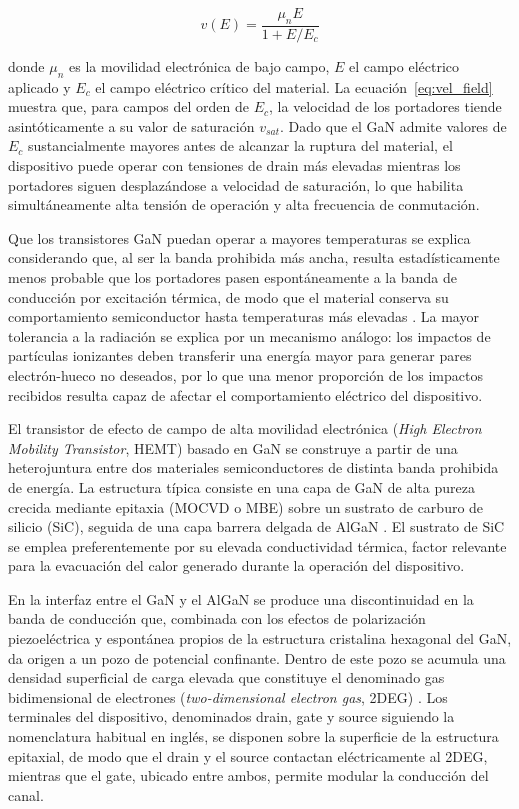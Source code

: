 \begin{equation}
    v(E) = \frac{\mu_n E}{1 + E/E_c}
    \label{eq:vel_field}
\end{equation}

donde $\mu_n$ es la movilidad electrónica de bajo campo, $E$ el campo eléctrico aplicado y $E_c$ el campo eléctrico crítico del material. La ecuación~\eqref{eq:vel_field} muestra que, para campos del orden de $E_c$, la velocidad de los portadores tiende asintóticamente a su valor de saturación $v_{sat}$. Dado que el GaN admite valores de $E_c$ sustancialmente mayores antes de alcanzar la ruptura del material, el dispositivo puede operar con tensiones de drain más elevadas mientras los portadores siguen desplazándose a velocidad de saturación, lo que habilita simultáneamente alta tensión de operación y alta frecuencia de conmutación.

Que los transistores GaN puedan operar a mayores temperaturas se explica considerando que, al ser la banda prohibida más ancha, resulta estadísticamente menos probable que los portadores pasen espontáneamente a la banda de conducción por excitación térmica, de modo que el material conserva su comportamiento semiconductor hasta temperaturas más elevadas \cite{Deblecker2015}. La mayor tolerancia a la radiación se explica por un mecanismo análogo: los impactos de partículas ionizantes deben transferir una energía mayor para generar pares electrón-hueco no deseados, por lo que una menor proporción de los impactos recibidos resulta capaz de afectar el comportamiento eléctrico del dispositivo.

El transistor de efecto de campo de alta movilidad electrónica (\textit{High Electron Mobility Transistor}, HEMT) basado en GaN se construye a partir de una heterojuntura entre dos materiales semiconductores de distinta banda prohibida de energía. La estructura típica consiste en una capa de GaN de alta pureza crecida mediante epitaxia (MOCVD o MBE) sobre un sustrato de carburo de silicio (SiC), seguida de una capa barrera delgada de AlGaN \cite{Mishra2008}. El sustrato de SiC se emplea preferentemente por su elevada conductividad térmica, factor relevante para la evacuación del calor generado durante la operación del dispositivo.

En la interfaz entre el GaN y el AlGaN se produce una discontinuidad en la banda de conducción que, combinada con los efectos de polarización piezoeléctrica y espontánea propios de la estructura cristalina hexagonal del GaN, da origen a un pozo de potencial confinante. Dentro de este pozo se acumula una densidad superficial de carga elevada que constituye el denominado gas bidimensional de electrones (\textit{two-dimensional electron gas}, 2DEG) \cite{Mishra2008}. Los terminales del dispositivo, denominados drain, gate y source siguiendo la nomenclatura habitual en inglés, se disponen sobre la superficie de la estructura epitaxial, de modo que el drain y el source contactan eléctricamente al 2DEG, mientras que el gate, ubicado entre ambos, permite modular la conducción del canal.

